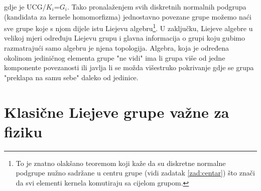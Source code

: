 gdje je UCG/$K_i$=$G_i$. Tako pronalaženjem svih diskretnih normalnih
podgrupa (kandidata za kernele homomorfizma) jednostavno povezane grupe 
možemo naći sve grupe koje 
s njom dijele istu Liejevu algebru\footnote{To je znatno olakšano teoremom
koji kaže da su diskretne normalne podgrupe nužno sadržane u
centru grupe (vidi zadatak \ref{zad:centar}) što znači da svi elementi
kernela komutiraju sa cijelom grupom. }.
U zaključku, Liejeve algebre u velikoj mjeri određuju Liejevu grupu i
glavna informacija o grupi koju gubimo razmatrajući samo algebru
je njena topologija. Algebra, koja je određena okolinom jediničnog
elementa grupe "ne vidi" ima li grupa više od jedne komponente povezanosti
ili javlja li se možda višestruko pokrivanje gdje se grupa "preklapa na samu sebe"
daleko od jedinice.

\section{Klasične Liejeve grupe važne za fiziku}
\label{sec:primjeriLie}

